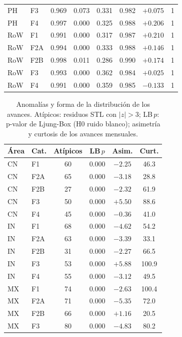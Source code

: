 \documentclass[12pt,letterpaper]{report}
\begin{document}
\begin{table}[htbp]
\begin{tabular}{llcccccc}
PH & F3 & 0.969 & 0.073 & 0.331 & 0.982 & $+0.075$ & 1 \\
PH & F4 & 0.997 & 0.000 & 0.325 & 0.988 & $+0.206$ & 1 \\
RoW & F1 & 0.991 & 0.000 & 0.317 & 0.987 & $+0.210$ & 1 \\
RoW & F2A & 0.994 & 0.000 & 0.333 & 0.988 & $+0.146$ & 1 \\
RoW & F2B & 0.998 & 0.011 & 0.286 & 0.990 & $+0.174$ & 1 \\
RoW & F3 & 0.993 & 0.000 & 0.362 & 0.984 & $+0.025$ & 1 \\
RoW & F4 & 0.991 & 0.000 & 0.359 & 0.985 & $-0.133$ & 1 \\
\bottomrule
\end{tabular}
\end{table}

\begin{table}[htbp]
\centering
\footnotesize
\caption[Anomalías y forma de las series]{Anomalías y forma de la distribución de los avances. Atípicos: residuos STL con $|z|>3$; LB$\,p$: p-valor de Ljung-Box (H0 ruido blanco); asimetría y curtosis de los avances mensuales.}
\label{tab:features_anomalias}
\begin{tabular}{llcccc}
\toprule
\rowcolor{uacjblue!15}
\textbf{Área} & \textbf{Cat.} & \textbf{Atípicos} & \textbf{LB}\,$p$ & \textbf{Asim.} & \textbf{Curt.} \\ \midrule
CN & F1 & 60 & 0.000 & $-2.25$ & 46.3 \\
CN & F2A & 65 & 0.000 & $-3.18$ & 28.8 \\
CN & F2B & 27 & 0.000 & $-2.32$ & 61.9 \\
CN & F3 & 50 & 0.000 & $+5.50$ & 88.6 \\
CN & F4 & 45 & 0.000 & $-0.36$ & 41.0 \\
IN & F1 & 68 & 0.000 & $-4.62$ & 54.2 \\
IN & F2A & 63 & 0.000 & $-3.39$ & 33.1 \\
IN & F2B & 31 & 0.000 & $-2.27$ & 66.5 \\
IN & F3 & 53 & 0.000 & $+5.88$ & 100.9 \\
IN & F4 & 55 & 0.000 & $-3.12$ & 49.5 \\
MX & F1 & 74 & 0.000 & $-2.63$ & 100.4 \\
MX & F2A & 71 & 0.000 & $-5.35$ & 72.0 \\
MX & F2B & 66 & 0.000 & $+1.16$ & 20.5 \\
MX & F3 & 80 & 0.000 & $-4.83$ & 80.2 \\

\end{tabular}
\end{table}
\end{document}
